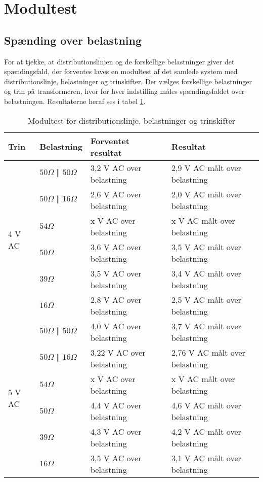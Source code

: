 

\section{Modultest}
\subsection{Spænding over belastning}
For at tjekke, at distributionslinjen og de forskellige belastninger giver det spændingsfald, der forventes laves en modultest af det samlede system med distributionslinje, belastninger og trinskifter. Der vælges forskellige belastninger og trin på transformeren, hvor for hver indstilling måles spændingsfaldet over belastningen. Resultaterne heraf ses i tabel \ref{tab:Modultesttrin}. 


\begin{table}[H]
	\centering
	\begin{tabular}{|l|l|l|l|}
		\hline
		\textbf{Trin} & \textbf{Belastning} & \textbf{Forventet resultat} & \textbf{Resultat} \\\hline
		
		\multirow{6}{*}{4 V AC} 
		& $50 \Omega\parallel 50 \Omega$ & 3,2 V AC over belastning & 2,9 V AC målt over belastning \\\hhline{~---} 	
		& $50 \Omega\parallel 16 \Omega$ & 2,6 V AC over belastning & 2,0 V AC målt over belastning \\\hhline{~---}
		& $54 \Omega$ & x V AC over belastning & x V AC målt over belastning \\\hhline{~---} 
		& $50 \Omega$ & 3,6 V AC over belastning & 3,5 V AC målt over belastning \\\hhline{~---} 	
		& $39 \Omega$ & 3,5 V AC over belastning & 3,4 V AC målt over belastning \\\hhline{~---} 
		& $16 \Omega$ & 2,8 V AC over belastning & 2,5 V AC målt over belastning \\\hline 
	
		
		\multirow{6}{*}{5 V AC} 
		& $50 \Omega\parallel 50 \Omega$ & 4,0 V AC over belastning & 3,7 V AC målt over belastning \\\hhline{~---} 	
		& $50 \Omega\parallel 16 \Omega$ & 3,22 V AC over belastning & 2,76 V AC målt over belastning \\\hhline{~---}
		& $54 \Omega$ & x V AC over belastning & x V AC målt over belastning \\\hhline{~---} 
		& $50 \Omega$ & 4,4 V AC over belastning & 4,6 V AC målt over belastning \\\hhline{~---} 	
		& $39 \Omega$ & 4,3 V AC over belastning & 4,2 V AC målt over belastning \\\hhline{~---} 
		& $16 \Omega$ & 3,5 V AC over belastning & 3,1 V AC målt over belastning \\\hline
		
	\end{tabular}
	\caption{Modultest for distributionslinje, belastninger og trinskifter}
	\label{tab:Modultesttrin}
\end{table}

